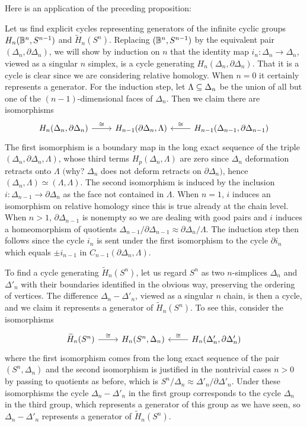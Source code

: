 Here is an application of the preceding proposition:
\begin{example}\label{find generator}
Let us find explicit cycles representing generators of the infinite cyclic groups $H_n(\mathbb{B}^n,S^{n-1})$ and $\widetilde{H}_n(S^n)$. Replacing $(\mathbb{B}^n,S^{n-1})$ by the equivalent pair $(\Delta_n,\partial\Delta_n)$, we will show by induction on $n$ that the identity map $i_n:\Delta_n\to\Delta_n$, viewed as a singular $n$ simplex, is a cycle generating $H_n(\Delta_n,\partial\Delta_n)$. That it is a cycle is clear since we are considering relative homology. When $n=0$ it certainly represents a generator. For the induction step, let $\Lambda\subseteq\Delta_n$ be the union of all but one of the $(n-1)$-dimensional faces of $\Delta_n$. Then we claim there are isomorphisms
\[\begin{tikzcd}
H_n(\Delta_n,\partial\Delta_n)\ar[r,"\cong"]&H_{n-1}(\partial\Delta_n,\Lambda)&H_{n-1}(\Delta_{n-1},\partial\Delta_{n-1})\ar[l,swap,"\cong"]
\end{tikzcd}\]
The first isomorphism is a boundary map in the long exact sequence of the triple $(\Delta_n,\partial\Delta_n,\Lambda)$, whose third terms $H_p(\Delta_n,\Lambda)$ are zero since $\Delta_n$ deformation retracts onto $\Lambda$ $($why? $\Delta_n$ does not deform retracts on $\partial\Delta_n$$)$, hence $(\Delta_n,\Lambda)\simeq(\Lambda,\Lambda)$. The second isomorphism is induced by the inclusion $i:\Delta_{n-1}\to\partial\Delta_n$ as the face not contained in $\Lambda$. When $n=1$, $i$ induces an isomorphism on relative homology since this is true already at the chain level. When $n>1$, $\partial\Delta_{n-1}$ is nonempty so we are dealing with good pairs and $i$ induces a homeomorphism of quotients $\Delta_{n-1}/\partial\Delta_{n-1}\approx\partial\Delta_n/\Lambda$. The induction step then follows since the cycle $i_n$ is
sent under the first isomorphism to the cycle $\partial i_n$ which equals $\pm i_{n-1}$ in $C_{n-1}(\partial\Delta_n,\Lambda)$.\par
To find a cycle generating $\widetilde{H}_n(S^n)$, let us regard $S^n$ as two $n$-simplices $\Delta_n$ and $\Delta'_n$ with their boundaries identified in the obvious way, preserving the ordering of vertices. The difference $\Delta_n-\Delta'_n$, viewed as a singular $n$ chain, is then a cycle, and we
claim it represents a generator of $\widetilde{H}_n(S^n)$. To see this, consider the isomorphisms
\[\begin{tikzcd}
\widetilde{H}_n(S^n)\ar[r,"\cong"]&H_n(S^n,\Delta_n)&H_n(\Delta'_n,\partial\Delta'_n)\ar[l,swap,"\cong"]
\end{tikzcd}\]
where the first isomorphism comes from the long exact sequence of the pair $(S^n,\Delta_n)$ and the second isomorphism is justified in the nontrivial cases $n>0$ by passing to quotients as before, which is $S^n/\Delta_n\approx\Delta'_n/\partial\Delta'_n$. Under these isomorphisms the cycle $\Delta_n-\Delta'_n$ in the first group corresponds to the cycle $\Delta_n$ in the third group, which represents a generator of this group as we have seen, so $\Delta_n-\Delta'_n$ represents a generator of $\widetilde{H}_n(S^n)$.
\end{example}
